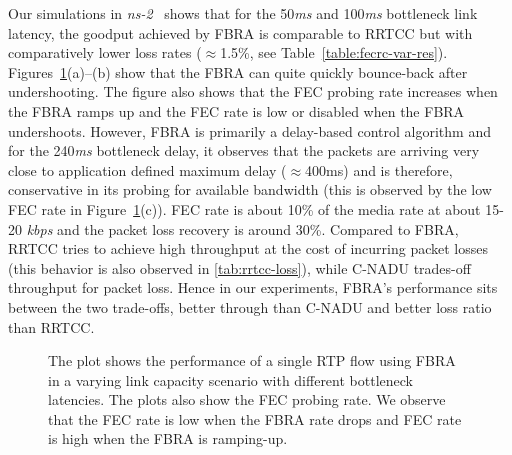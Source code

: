 Our simulations in \emph{ns-2}~\cite{ns2} shows that for the 50\emph{ms} and
100\emph{ms} bottleneck link latency, the goodput achieved by FBRA is
comparable to RRTCC but with comparatively lower loss rates ($\approx$1.5\%,
see Table~\ref{table:fecrc-var-res}). Figures~\ref{fig:fecrc-var}(a)--(b) show
that the FBRA can quite quickly bounce-back after undershooting. The figure
also shows that the FEC probing rate increases when the FBRA ramps up and the
FEC rate is low or disabled when the FBRA undershoots. However, FBRA is
primarily a delay-based control algorithm and for the 240\emph{ms} bottleneck
delay, it observes that the packets are arriving very close to application
defined maximum delay ($\approx$400ms) and is therefore, conservative in its
probing for available bandwidth (this is observed by the low FEC rate in
Figure~\ref{fig:fecrc-var}(c)). FEC rate is about 10\% of the media rate at
about 15-20 \emph{kbps} and the packet loss recovery is around 30\%. Compared
to FBRA, RRTCC tries to achieve high throughput at the cost of incurring
packet losses (this behavior is also observed in \ref{tab:rrtcc-loss}), while
C-NADU trades-off throughput for packet loss. Hence in our experiments, FBRA's
performance sits between the two trade-offs, better through than C-NADU and
better loss ratio than RRTCC.



\begin{figure}
  \centerline{
}
\caption{The plot shows the performance of a single RTP flow using FBRA in a
varying link capacity scenario with different bottleneck latencies. The plots
also show the FEC probing rate. We observe that the FEC rate is low when the
FBRA rate drops and FEC rate is high when the FBRA is ramping-up.}
\label{fig:fecrc-var}
\end{figure}

